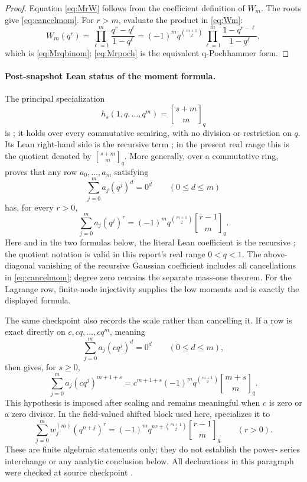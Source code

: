\documentclass[11pt]{article}
\theoremstyle{definition}
\theoremstyle{remark}
\newcommand{\qbinom}[2]{\genfrac{[}{]}{0pt}{}{#1}{#2}_{q}}
\begin{document}
\begin{proof}
Equation \eqref{eq:MrW} follows from the coefficient definition of \(W_m\).
The roots give \eqref{eq:cancelmom}. For \(r>m\), evaluate the product in
\eqref{eq:Wm}:
\[
 W_m(q^r)=\prod_{\ell=1}^m\frac{q^r-q^\ell}{1-q^\ell}
 =(-1)^m q^{\binom{m+1}{2}}
 \prod_{\ell=1}^m\frac{1-q^{r-\ell}}{1-q^\ell},
\]
which is \eqref{eq:Mrqbinom}; \eqref{eq:Mrpoch} is the equivalent
q-Pochhammer form.
\end{proof}

\paragraph{Post-snapshot Lean status of the moment formula.}
The principal specialization
\[
 h_s(1,q,\ldots,q^m)=\qbinom{s+m}{m}
\]
is ; it holds over every commutative
semiring, with no division or restriction on \(q\).  Its Lean right-hand side
is the recursive term ; in the present
real range this is the quotient denoted by \(\qbinom{s+m}{m}\).  More
generally, over a commutative ring,
 proves that any row
\(a_0,\ldots,a_m\) satisfying
\[
 \sum_{j=0}^{m}a_j(q^j)^d=0^d\qquad(0\le d\le m)
\]
has, for every \(r>0\),
\[
 \sum_{j=0}^{m}a_j(q^j)^r
 =(-1)^m q^{\binom{m+1}{2}}\qbinom{r-1}{m}.
\]
Here and in the two formulas below, the literal Lean coefficient is the
recursive ; the quotient notation is valid in this
report's real range \(0<q<1\).
The above-diagonal vanishing of the recursive Gaussian coefficient includes
all cancellations in \eqref{eq:cancelmom}; degree zero remains the separate
mass-one theorem.  For the Lagrange row, finite-node injectivity supplies the
low moments and  is exactly
the displayed formula.

The same checkpoint also records the scale rather than cancelling it.  If a
row is exact directly on \(c,cq,\ldots,cq^m\), meaning
\[
 \sum_{j=0}^{m}a_j(cq^j)^d=0^d\qquad(0\le d\le m),
\]
then  gives, for \(s\ge0\),
\[
 \sum_{j=0}^{m}a_j(cq^j)^{m+1+s}
 =c^{m+1+s}(-1)^m q^{\binom{m+1}{2}}\qbinom{m+s}{m}.
\]
This hypothesis is imposed after scaling and remains meaningful when \(c\) is
zero or a zero divisor.  In the field-valued shifted block used here,
 specializes it to
\[
 \sum_{j=0}^{m}w_j^{(m)}(q^{n+j})^r
 =(-1)^m q^{nr+\binom{m+1}{2}}\qbinom{r-1}{m}
 \qquad(r>0).
\]
These are finite algebraic statements only; they do not establish the power-
series interchange or any analytic conclusion below.  All declarations in
this paragraph were checked at source checkpoint
.
\end{document}
